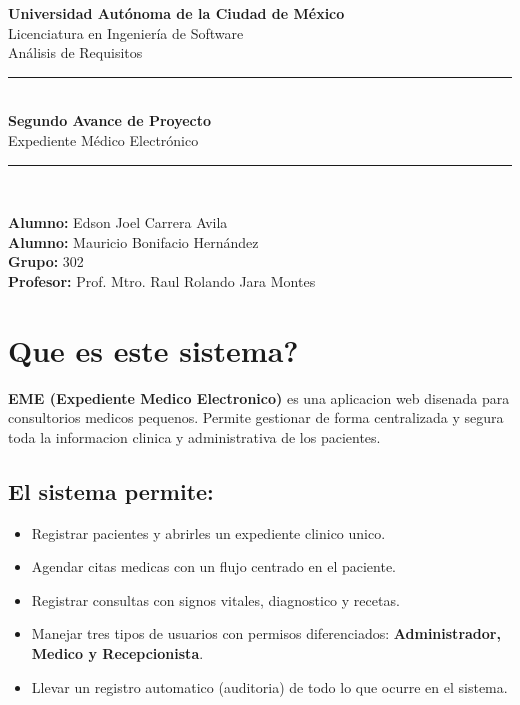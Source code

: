 \documentclass[11pt,a4paper]{article}
\begin{document}
\begin{titlepage}
    \centering
    \vspace*{1.5cm}

    {\Large \textbf{Universidad Autónoma de la Ciudad de México}}\\[0.3cm]
    {\large Licenciatura en Ingeniería de Software}\\[0.2cm]
    {\large Análisis de Requisitos}\\[2.5cm]

    \rule{\linewidth}{0.5pt}\\[0.4cm]
    {\LARGE \bfseries Segundo Avance de Proyecto}\\[0.3cm]
    {\Large Expediente Médico Electrónico}\\[0.3cm]
    \rule{\linewidth}{0.5pt}\\[2cm]

    \begin{flushleft}
        \textbf{Alumno:} Edson Joel Carrera Avila \\[0.3cm]
        \textbf{Alumno:} Mauricio Bonifacio Hernández \\[0.3cm]
        \textbf{Grupo:} 302 \\[0.3cm]
        \textbf{Profesor:} Prof. Mtro. Raul Rolando Jara Montes \\[0.3cm]
    \end{flushleft}
    \vfill
\end{titlepage}

{
    \hypersetup{linkcolor=black}
    \tableofcontents
}
\newpage

\section{Que es este sistema?}

\textbf{EME (Expediente Medico Electronico)} es una aplicacion web disenada para consultorios medicos pequenos. Permite gestionar de forma centralizada y segura toda la informacion clinica y administrativa de los pacientes.
\subsection*{El sistema permite:}

\begin{itemize}
    \item Registrar pacientes y abrirles un expediente clinico unico.
    \item Agendar citas medicas con un flujo centrado en el paciente.
    \item Registrar consultas con signos vitales, diagnostico y recetas.
    \item Manejar tres tipos de usuarios con permisos diferenciados: \textbf{Administrador, Medico y Recepcionista}.
    \item Llevar un registro automatico (auditoria) de todo lo que ocurre en el sistema.
\end{itemize}
\end{document}
